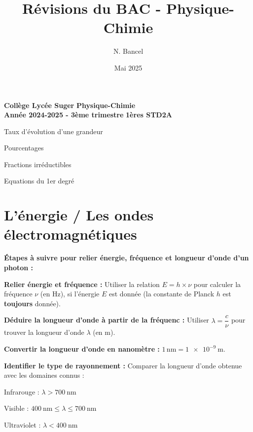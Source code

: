 \documentclass[a4paper,12pt]{article}
\title{Révisions du BAC - Physique-Chimie}
\author{N. Bancel}
\date{Mai 2025}
\begin{document}
\textbf{Collège Lycée Suger}
\hfill
\textbf{Physique-Chimie} \\

\textbf{Année 2024-2025 - 3ème trimestre}
\hfill
\textbf{1ères STD2A} \par

{\let\newpage\relax\maketitle}


\begin{tcolorbox}[colback=blue!10!white, colframe=blue!75!black, title=Concepts importants à retenir]
  \begin{compactitem}
    \item Taux d'évolution d'une grandeur
    \item Pourcentages
    \item Fractions irréductibles
    \item Equations du 1er degré
  \end{compactitem}
\end{tcolorbox}

\section*{L'énergie / Les ondes électromagnétiques}

\begin{tcolorbox}[colback=blue!5!white, colframe=blue!75!black, title=Méthode, breakable]
  \textbf{Étapes à suivre pour relier énergie, fréquence et longueur d'onde d'un photon :}
  \begin{compactitem}
    \item \textbf{Relier énergie et fréquence :} Utiliser la relation $E = h \times \nu$ pour calculer la fréquence $\nu$ (en \si{\hertz}), si l'énergie $E$ est donnée (la constante de Planck $h$ est \textbf{toujours} donnée).
    \item \textbf{Déduire la longueur d'onde à partir de la fréquenc :} Utiliser $\lambda = \dfrac{c}{\nu}$ pour trouver la longueur d'onde $\lambda$ (en \si{\meter}).
    \item \textbf{Convertir la longueur d'onde en nanomètre :} $1\,\text{nm} = \SI{1e-9}{\meter}$.
    \item \textbf{Identifier le type de rayonnement :} Comparer la longueur d'onde obtenue avec les domaines connus :
    \begin{compactitem}
      \item Infrarouge : $\lambda > \SI{700}{\nano\meter}$
      \item Visible : $\SI{400}{\nano\meter} \leq \lambda \leq \SI{700}{\nano\meter}$
      \item Ultraviolet : $\lambda < \SI{400}{\nano\meter}$
    \end{compactitem}
  \end{compactitem}
  \end{tcolorbox}
\end{document}
